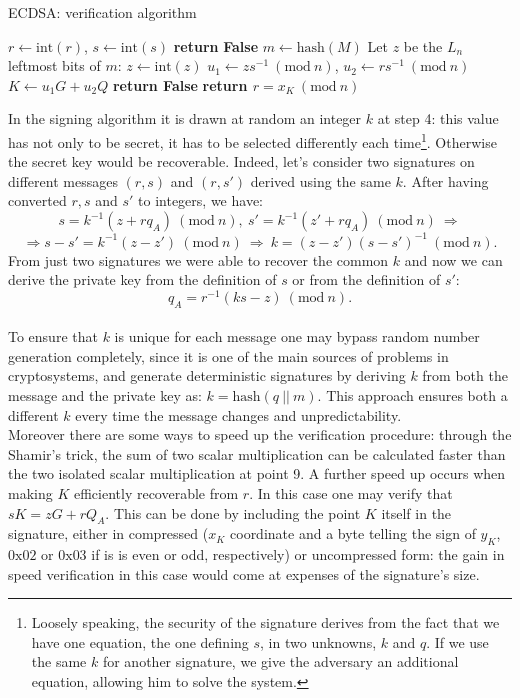 \begin{algorithm}
	\caption{ECDSA: verification algorithm}
	\label{alg:ecdsa_ver}
	\begin{algorithmic}[1]
		\State $r \gets \text{int}(r)$, $s \gets \text{int}(s)$
		\State \textbf{return} {\bf False}
		\EndIf
		\State $m \gets \text{hash}(M)$
		\State Let $z$ be the $L_n$ leftmost bits of $m$: $z \gets \text{int}(z)$
		\State $u_1 \gets zs^{-1} \ (\text{mod} \ n)$, $u_2 \gets rs^{-1} \ (\text{mod} \ n)$
		\State $K \gets u_1G + u_2Q$
		\State \textbf{return False} 
		\EndIf
		\State \textbf{return $r = x_K \ (\text{mod} \ n)$}
		\EndProcedure	
	\end{algorithmic}
\end{algorithm}

\bigskip
\noindent
In the signing algorithm it is drawn at random an integer $k$ at step 4: this value has not only to be secret, it has to be selected differently each time\footnote{Loosely speaking, the security of the signature derives from the fact that we have one equation, the one defining $s$, in two unknowns, $k$ and $q$. If we use the same $k$ for another signature, we give the adversary an additional equation, allowing him to solve the system.}. Otherwise the secret key would be recoverable. Indeed, let's consider two signatures on different messages $(r, s)$ and $(r, s')$ derived using the same $k$. After having converted $r, s$ and $s'$ to integers, we have:
$$s = k^{-1}(z + rq_A) \ (\text{mod} \ n), \ s' = k^{-1}(z' + rq_A) \ (\text{mod} \ n) \ \Longrightarrow $$ $$\Longrightarrow s - s' = k^{-1}(z - z') \ (\text{mod} \ n) \ \Longrightarrow \ k = (z - z')(s - s')^{-1} \ (\text{mod} \ n).$$
From just two signatures we were able to recover the common $k$ and now we can derive the private key from the definition of $s$ or from the definition of $s'$:
$$q_A = r^{-1}(ks - z) \ (\text{mod} \ n).$$
\\
To ensure that $k$ is unique for each message one may bypass random number generation completely, since it is one of the main sources of problems in cryptosystems, and generate deterministic signatures by deriving $k$ from both the message and the private key as: $k = \text{hash}(q \ || \ m)$. This approach ensures both a different $k$ every time the message changes and unpredictability. 
\\
Moreover there are some ways to speed up the verification procedure: through the Shamir's trick, the sum of two scalar multiplication can be calculated faster than the two isolated scalar multiplication at point 9. A further speed up occurs when making $K$ efficiently recoverable from $r$. In this case one may verify that $sK = zG + rQ_A$. This can be done by including the point $K$ itself in the signature, either in compressed ($x_K$ coordinate and a byte telling the sign of $y_K$, $0\text{x}02$ or $0\text{x}03$ if is is even or odd, respectively) or uncompressed form: the gain in speed verification in this case would come at expenses of the signature's size.

